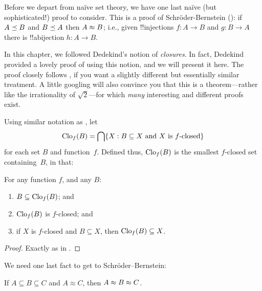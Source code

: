 \documentclass[../../../include/open-logic-section]{subfiles}
\begin{document}


Before we depart from na\"ive set theory, we have one last na\"ive
(but sophisticated!) proof to consider. This is a proof of
Schr\"oder-Bernstein (): if
$A \preceq B$ and $B \preceq A$ then $A \approx B$; i.e., given
!!{injection}s $f \colon A \to B$ and $g \colon B \to A$ there is
!!a{bijection} $h \colon A \to B$. 

In this chapter, we followed Dedekind's notion of \emph{closures}. In
fact, Dedekind provided a lovely proof of using this notion, and we
will present it here. The proof closely follows
\citet[pp.~157--8]{Potter2004}, if you want a slightly different but
essentially similar treatment. A little googling will also convince
you that this is a theorem---rather like the irrationality of
$\sqrt{2}$---for which \emph{many} interesting and different proofs
exist.

Using similar notation as ,
let
\[
\mathrm{Clo}_{f}(B) = \bigcap \{ X : B \subseteq X 
\text{ and $X$ is $f$-closed} \}
\]
for each set $B$ and function~$f$. Defined thus,
$\mathrm{Clo}_{f}(B)$ is the smallest $f$-closed set containing~$B$,
in that:

\begin{prop}
	For any function $f$, and any $B$:
	\begin{enumerate}
		\item{} $B \subseteq \mathrm{Clo}_{f}(B)$; and
		\item{} $\mathrm{Clo}_{f}(B)$ is $f$-closed; and
		\item{} if $X$ is $f$-closed and $B
		\subseteq X$, then $\mathrm{Clo}_{f}(B) \subseteq X$.
	\end{enumerate}
\end{prop}

\begin{proof}
Exactly as in .
\end{proof}

We need one last fact to get to Schr\"oder--Bernstein:

\begin{prop}
If $A \subseteq B \subseteq C$ and $A \approx C$, then $A \approx B \approx C$.
\end{prop}
\end{document}
